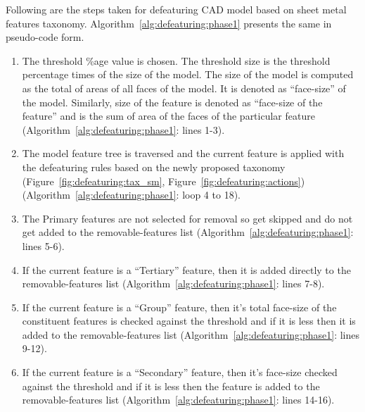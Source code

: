 
Following are the steps taken for defeaturing CAD model based on sheet metal features taxonomy. Algorithm~\ref{alg:defeaturing:phase1} presents the same in pseudo-code form.

\begin{enumerate}
[noitemsep,topsep=2pt,parsep=2pt,partopsep=2pt]
\item The threshold \%age value is chosen. The threshold size is the threshold percentage times of the size of the model. The size of the model  is computed as the total of areas of all faces of the model. It is denoted as ``face-size'' of the model. Similarly, size of the feature is denoted as ``face-size of the feature'' and is the sum of area of the faces of the particular feature (Algorithm~\ref{alg:defeaturing:phase1}: lines 1-3).
\item The model feature tree is traversed and the current feature is applied with the defeaturing rules based on the newly proposed taxonomy (Figure~\ref{fig:defeaturing:tax_sm}, Figure~\ref{fig:defeaturing:actions}) (Algorithm~\ref{alg:defeaturing:phase1}: loop 4 to 18). 
\item The Primary features are not selected for removal so get skipped and do not get added to the removable-features list  (Algorithm~\ref{alg:defeaturing:phase1}: lines 5-6).
\item If the current feature is a ``Tertiary'' feature, then it is added directly to the removable-features list (Algorithm~\ref{alg:defeaturing:phase1}: lines 7-8).
\item If the current feature is a ``Group'' feature, then it's total face-size of the constituent features is checked against the threshold and if it is less then it is added to the removable-features list (Algorithm~\ref{alg:defeaturing:phase1}: lines 9-12).
\item If the current feature is a ``Secondary'' feature, then it's face-size checked against the threshold and if it is less then the feature is added to the removable-features list  (Algorithm~\ref{alg:defeaturing:phase1}: lines 14-16). 


\end{enumerate}
